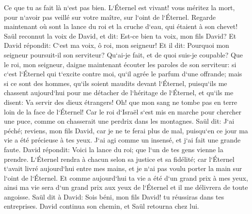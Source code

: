 \verse Ce que tu as fait là n`est pas bien. L`Éternel est vivant! vous méritez la mort, pour n`avoir pas veillé sur votre maître, sur l`oint de l`Éternel. Regarde maintenant où sont la lance du roi et la cruche d`eau, qui étaient à son chevet! 
\verse Saül reconnut la voix de David, et dit: Est-ce bien ta voix, mon fils David? Et David répondit: C`est ma voix, ô roi, mon seigneur! 
\verse Et il dit: Pourquoi mon seigneur poursuit-il son serviteur? Qu`ai-je fait, et de quoi suis-je coupable? 
\verse Que le roi, mon seigneur, daigne maintenant écouter les paroles de son serviteur: si c`est l`Éternel qui t`excite contre moi, qu`il agrée le parfum d`une offrande; mais si ce sont des hommes, qu`ils soient maudits devant l`Éternel, puisqu`ils me chassent aujourd`hui pour me détacher de l`héritage de l`Éternel, et qu`ils me disent: Va servir des dieux étrangers! 
\verse Oh! que mon sang ne tombe pas en terre loin de la face de l`Éternel! Car le roi d`Israël s`est mis en marche pour chercher une puce, comme on chasserait une perdrix dans les montagnes. 
\verse Saül dit: J`ai péché; reviens, mon fils David, car je ne te ferai plus de mal, puisqu`en ce jour ma vie a été précieuse à tes yeux. J`ai agi comme un insensé, et j`ai fait une grande faute. 
\verse David répondit: Voici la lance du roi; que l`un de tes gens vienne la prendre. 
\verse L`Éternel rendra à chacun selon sa justice et sa fidélité; car l`Éternel t`avait livré aujourd`hui entre mes mains, et je n`ai pas voulu porter la main sur l`oint de l`Éternel. 
\verse Et comme aujourd`hui ta vie a été d`un grand prix à mes yeux, ainsi ma vie sera d`un grand prix aux yeux de l`Éternel et il me délivrera de toute angoisse. 
\verse Saül dit à David: Sois béni, mon fils David! tu réussiras dans tes entreprises. David continua son chemin, et Saül retourna chez lui. 

